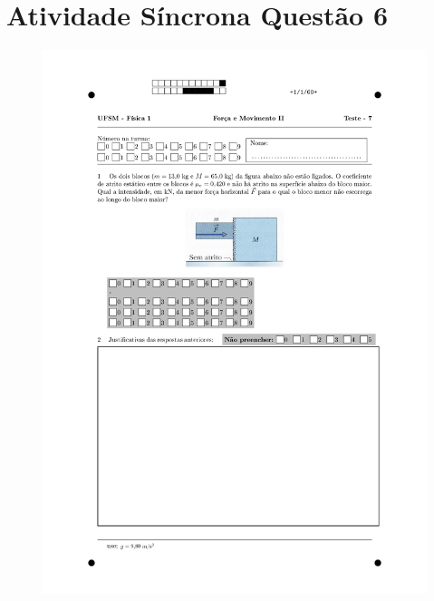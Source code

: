 \section{Atividade Síncrona Questão 6} \label{ch:orp1e6}
\vspace*{\fill}
\begin{figure}[H]\centering
\includegraphics[scale=0.7]{fig/orp1q6_page-0001.jpg}
\end{figure}
\vspace*{\fill}
